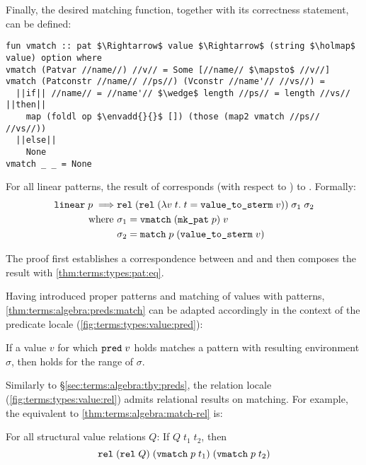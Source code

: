 \noindent
Finally, the desired matching function, together with its correctness statement, can be defined:
%
\begin{lstlisting}
fun vmatch :: pat $\Rightarrow$ value $\Rightarrow$ (string $\holmap$ value) option where
vmatch (Patvar //name//) //v// = Some [//name// $\mapsto$ //v//]
vmatch (Patconstr //name// //ps//) (Vconstr //name'// //vs//) =
  ||if|| //name// = //name'// $\wedge$ length //ps// = length //vs// ||then||
    map (foldl op $\envadd{}{}$ []) (those (map2 vmatch //ps// //vs//))
  ||else||
    None
vmatch _ _ = None
\end{lstlisting}
%
\begin{lemma}
  For all linear patterns, the result of  corresponds (with respect to ) to . Formally:
  \begin{align*}
    \texttt{\textup{linear}}\;p \implies &\texttt{\textup{rel}}\;(\texttt{\textup{rel}}\;(\lambda v\; t.\; t = \texttt{\textup{value\_to\_sterm}}\;v))\;\sigma_1\;\sigma_2 \\
    \text{where } &\sigma_1 = \texttt{\textup{vmatch}}\;(\texttt{\textup{mk\_pat}}\;p)\;v \\
    &\sigma_2 = \texttt{\textup{match}}\;p\;( \texttt{\textup{value\_to\_sterm}}\;v)
  \end{align*}
\end{lemma}

\noindent
The proof first establishes a correspondence between  and  and then composes the result with \cref{thm:terms:types:pat:eq}.

Having introduced proper patterns and matching of values with patterns, \cref{thm:terms:algebra:preds:match} can be adapted accordingly in the context of the predicate locale (\cref{fig:terms:types:value:pred}):
%
\begin{lemma}
  If a value $v$ for which $\texttt{\textup{pred}}\;v$ holds matches a pattern with resulting environment $\sigma$, then  holds for the range of $\sigma$.
\end{lemma}

\noindent
Similarly to §\ref{sec:terms:algebra:thy:preds}, the relation locale (\cref{fig:terms:types:value:rel}) admits relational results on matching.
For example, the equivalent to \cref{thm:terms:algebra:match-rel} is:
%
\begin{lemma}
  For all structural value relations $Q$:
  If $Q\;t_1\;t_2$, then
  \[ \texttt{\textup{rel}}\;\allowbreak(\texttt{\textup{rel}}\;Q)\allowbreak\;(\texttt{\textup{vmatch}}\;p\;t_1)\;(\texttt{\textup{vmatch}}\;p\;t_2) \]
\end{lemma}
